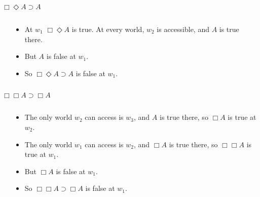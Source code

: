 \documentclass[
  14pt,
  letterpaper,
  ignorenonframetext,
  aspectratio=169,
  handout]{beamer}
\begin{document}
\begin{frame}{\(\Box \Diamond A \supset A\)}
\protect\hypertarget{box-diamond-a-supset-a}{}
\begin{columns}
    \begin{column}{0.45\textwidth}
    \end{column}
    \begin{column}{0.5\textwidth}
    \begin{itemize}
    \item At $w_1$ $\Box \Diamond A$ is true. At every world, $w_2$ is accessible, and $A$ is true there.
    \item But $A$ is false at $w_1$.
    \item So $\Box \Diamond A \supset A$ is false at $w_1$.
    \end{itemize}
  \end{column}
\end{columns}
\end{frame}

\begin{frame}{\(\Box \Box A \supset \Box A\)}
\protect\hypertarget{box-box-a-supset-box-a}{}
\begin{columns}
    \begin{column}{0.45\textwidth}
    \end{column}
    \begin{column}{0.5\textwidth}
    \begin{itemize}
    \item The only world $w_2$ can access is $w_3$, and $A$ is true there, so $\Box A$ is true at $w_2$.
    \item The only world $w_1$ can access is $w_2$, and $\Box A$ is true there, so $\Box \Box A$ is true at $w_1$.
    \item But $\Box A$ is false at $w_1$.
    \item So $\Box \Box A \supset \Box A$ is false at $w_1$.
    \end{itemize}
  \end{column}
\end{columns}
\end{frame}
\end{document}
